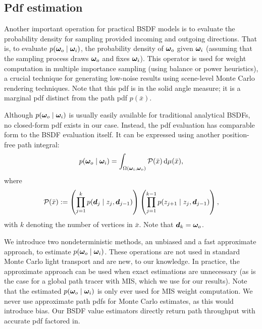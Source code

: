 \subsection{Pdf estimation}
\label{subsec:ours_pdf}

Another important operation for practical BSDF models is to evaluate the probability density for sampling provided incoming and outgoing directions.
That is, to evaluate $p(\bm{\omega}_o \;|\; \bm{\omega}_i)$, the probability density of $\bm{\omega}_o$ given $\bm{\omega}_i$ (assuming that the sampling process draws $\bm{\omega}_o$ and fixes $\bm{\omega}_i$).
This operator is used for weight computation in multiple importance sampling (using balance or power heuristics), a crucial technique for generating low-noise results using scene-level Monte Carlo rendering techniques. Note that this pdf is in the solid angle measure; it is a marginal pdf distinct from the path pdf $p(\bar x)$.

Although $p(\bm{\omega}_o \;|\; \bm{\omega}_i)$ is usually easily available for traditional analytical BSDFs, no closed-form pdf exists in our case. Instead, the pdf evaluation has comparable form to the BSDF evaluation itself. It can be expressed using another position-free path integral:
\begin{equation}
\label{eqn:ours_pdf}
p(\bm{\omega}_o \;|\; \bm{\omega}_i) = \int_{\Omega(\bm{\omega}_i, \bm{\omega}_o)} \mathcal{P}(\bar{x}) \,\mathrm{d}\mu(\bar{x}),
\end{equation}
where
\begin{equation}
\mathcal{P}(\bar{x}) := \left(\prod_{j = 1}^k p(\bm{d}_j \;|\; z_j, \bm{d}_{j - 1})\right) \left(\prod_{j = 1}^{k - 1} p(z_{j + 1} \;|\; z_j, \bm{d}_{j - 1})\right),
\end{equation}
with $k$ denoting the number of vertices in $\bar{x}$. Note that $\bm{d}_k = \bm{\omega}_o$.

We introduce two nondeterministic methods, an unbiased and a fast approximate approach, to estimate $p(\bm{\omega}_o \;|\; \bm{\omega}_i)$.
These operations are not used in standard Monte Carlo light transport and are new, to our knowledge.
In practice, the approximate approach can be used when exact estimations are unnecessary (as is the case for a global path tracer with MIS, which we use for our results).
Note that the estimated $p(\bm{\omega}_o \;|\; \bm{\omega}_i)$ is only ever used for MIS weight computation.
We never use approximate path pdfs for Monte Carlo estimates, as this would introduce bias.
Our BSDF value estimators directly return path throughput with accurate pdf factored in.

